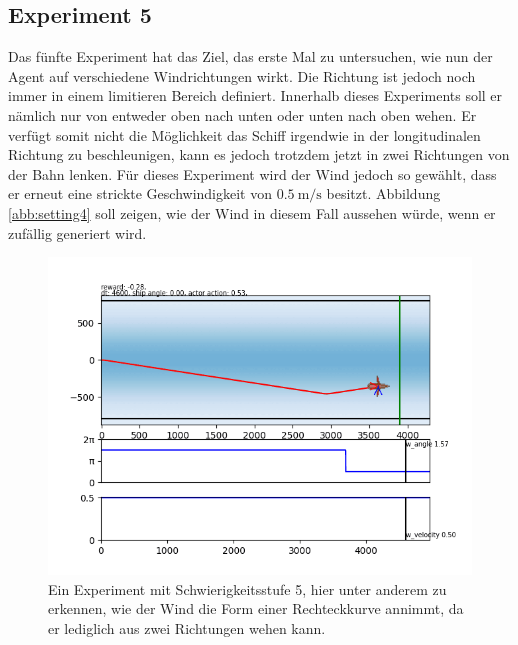 \documentclass[]{iat}
\begin{document}
\subsection*{Experiment 5}
Das fünfte Experiment hat das Ziel, das erste Mal zu untersuchen, wie nun der Agent auf verschiedene Windrichtungen wirkt. Die Richtung ist jedoch noch immer in einem limitieren Bereich definiert. Innerhalb dieses Experiments soll er nämlich nur von entweder oben nach unten oder unten nach oben wehen. Er verfügt somit nicht die Möglichkeit das Schiff irgendwie in der longitudinalen Richtung zu beschleunigen, kann es jedoch trotzdem jetzt in zwei Richtungen von der Bahn lenken. Für dieses Experiment wird der Wind jedoch so gewählt, dass er erneut eine strickte Geschwindigkeit von $\SI{0.5}{\m\per\s}$ besitzt. Abbildung \ref{abb:setting4} soll zeigen, wie der Wind in diesem Fall aussehen würde, wenn er zufällig generiert wird.
\begin{figure}[H]
    \includegraphics[width=\textwidth]{graphics/settings/s5.png}
    \centering
    \caption{Ein Experiment mit Schwierigkeitsstufe 5, hier unter anderem zu erkennen, wie der Wind die Form einer Rechteckkurve annimmt, da er lediglich aus zwei Richtungen wehen kann.}
    \label{abb:setting5}
\end{figure}
\end{document}

